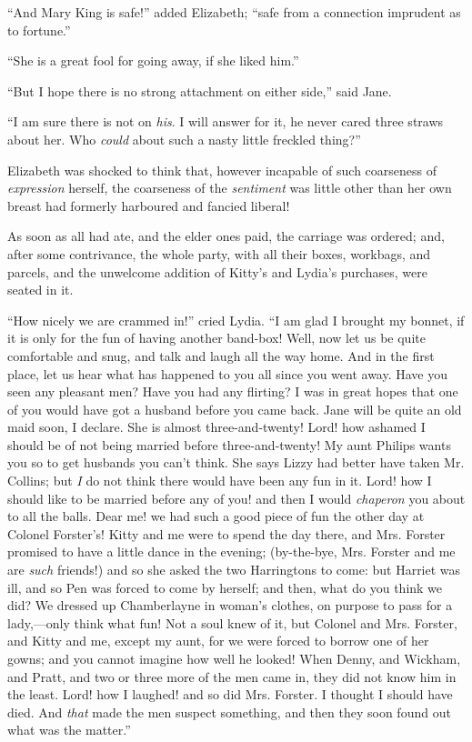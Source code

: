 ``And Mary King is safe!'' added Elizabeth; ``safe from a connection imprudent as to fortune.''

``She is a great fool for going away, if she liked him.''

``But I hope there is no strong attachment on either side,'' said Jane.

``I am sure there is not on \textit{his}. I will answer for it, he never cared three straws about her. Who \textit{could} about such a nasty little freckled thing?''

Elizabeth was shocked to think that, however incapable of such coarseness of \textit{expression} herself, the coarseness of the \textit{sentiment} was little other than her own breast had formerly harboured and fancied liberal!

As soon as all had ate, and the elder ones paid, the carriage was ordered; and, after some contrivance, the whole party, with all their boxes, workbags, and parcels, and the unwelcome addition of Kitty's and Lydia's purchases, were seated in it.

``How nicely we are crammed in!'' cried Lydia. ``I am glad I brought my bonnet, if it is only for the fun of having another band-box! Well, now let us be quite comfortable and snug, and talk and laugh all the way home. And in the first place, let us hear what has happened to you all since you went away. Have you seen any pleasant men? Have you had any flirting? I was in great hopes that one of you would have got a husband before you came back. Jane will be quite an old maid soon, I declare. She is almost three-and-twenty! Lord! how ashamed I should be of not being married before three-and-twenty! My aunt Philips wants you so to get husbands you can't think. She says Lizzy had better have taken Mr. Collins; but \textit{I} do not think there would have been any fun in it. Lord! how I should like to be married before any of you! and then I would \textit{chaperon} you about to all the balls. Dear me! we had such a good piece of fun the other day at Colonel Forster's! Kitty and me were to spend the day there, and Mrs. Forster promised to have a little dance in the evening; (by-the-bye, Mrs. Forster and me are \textit{such} friends!) and so she asked the two Harringtons to come: but Harriet was ill, and so Pen was forced to come by herself; and then, what do you think we did? We dressed up Chamberlayne in woman's clothes, on purpose to pass for a lady,---only think what fun! Not a soul knew of it, but Colonel and Mrs. Forster, and Kitty and me, except my aunt, for we were forced to borrow one of her gowns; and you cannot imagine how well he looked! When Denny, and Wickham, and Pratt, and two or three more of the men came in, they did not know him in the least. Lord! how I laughed! and so did Mrs. Forster. I thought I should have died. And \textit{that} made the men suspect something, and then they soon found out what was the matter.''

